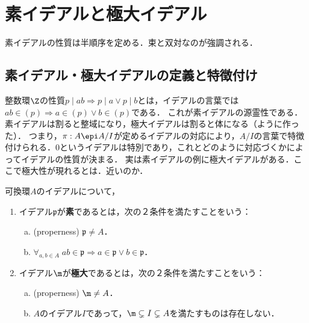 \documentclass[uplatex,dvipdfmx]{jsreport}
\renewcommand{\p}{\mathfrak{p}}
\begin{document}
\section{素イデアルと極大イデアル}

\begin{tcolorbox}[colframe=ForestGreen, colback=ForestGreen!10!white,breakable,colbacktitle=ForestGreen!40!white,coltitle=black,fonttitle=\bfseries\sffamily,
title=]
    素イデアルの性質は半順序を定める．束と双対なのが強調される．
\end{tcolorbox}

\subsection{素イデアル・極大イデアルの定義と特徴付け}

\begin{tcolorbox}[colframe=ForestGreen, colback=ForestGreen!10!white,breakable,colbacktitle=ForestGreen!40!white,coltitle=black,fonttitle=\bfseries\sffamily,
title=]
    整数環$\Z$の性質$p\mid ab\Rightarrow p\mid a\lor p\mid b$とは，イデアルの言葉では$ab\in (p)\Rightarrow a\in(p)\lor b\in(p)$である．
    これが素イデアルの源霊性である．
    素イデアルは割ると整域になり，極大イデアルは割ると体になる（ように作った）．
    つまり，$\pi:A\epi A/I$が定めるイデアルの対応により，$A/I$の言葉で特徴付けられる．$0$というイデアルは特別であり，これとどのように対応づくかによってイデアルの性質が決まる．
    実は素イデアルの例に極大イデアルがある．ここで極大性が現れるとは．近いのか．
\end{tcolorbox}

\begin{definition}
    可換環$A$のイデアルについて，
    \begin{enumerate}
        \item イデアル$\p$が\textbf{素}であるとは，次の２条件を満たすことをいう：
        \begin{enumerate}[(a)]
            \item (properness) $\p\ne A$．
            \item $\forall_{a,b\in A}\;ab\in\p\Rightarrow a\in\p\lor b\in\p$．
        \end{enumerate}
        \item イデアル$\m$が\textbf{極大}であるとは，次の２条件を満たすことをいう：
        \begin{enumerate}[(a)]
            \item (properness) $\m\ne A$．
            \item $A$のイデアル$I$であって，$\m\subsetneq I\subsetneq A$を満たすものは存在しない．
        \end{enumerate}
    \end{enumerate}
\end{definition}
\end{document}
